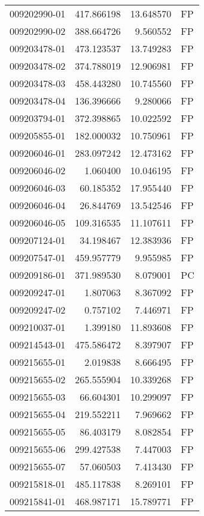 \begin{tabular}{lrrl}
009202990-01 &  417.866198 &    13.648570 &   FP \\
009202990-02 &  388.664726 &     9.560552 &   FP \\
009203478-01 &  473.123537 &    13.749283 &   FP \\
009203478-02 &  374.788019 &    12.906981 &   FP \\
009203478-03 &  458.443280 &    10.745560 &   FP \\
009203478-04 &  136.396666 &     9.280066 &   FP \\
009203794-01 &  372.398865 &    10.022592 &   FP \\
009205855-01 &  182.000032 &    10.750961 &   FP \\
009206046-01 &  283.097242 &    12.473162 &   FP \\
009206046-02 &    1.060400 &    10.046195 &   FP \\
009206046-03 &   60.185352 &    17.955440 &   FP \\
009206046-04 &   26.844769 &    13.542546 &   FP \\
009206046-05 &  109.316535 &    11.107611 &   FP \\
009207124-01 &   34.198467 &    12.383936 &   FP \\
009207547-01 &  459.957779 &     9.955985 &   FP \\
009209186-01 &  371.989530 &     8.079001 &   PC \\
009209247-01 &    1.807063 &     8.367092 &   FP \\
009209247-02 &    0.757102 &     7.446971 &   FP \\
009210037-01 &    1.399180 &    11.893608 &   FP \\
009214543-01 &  475.586472 &     8.397907 &   FP \\
009215655-01 &    2.019838 &     8.666495 &   FP \\
009215655-02 &  265.555904 &    10.339268 &   FP \\
009215655-03 &   66.604301 &    10.299097 &   FP \\
009215655-04 &  219.552211 &     7.969662 &   FP \\
009215655-05 &   86.403179 &     8.082854 &   FP \\
009215655-06 &  299.427538 &     7.447003 &   FP \\
009215655-07 &   57.060503 &     7.413430 &   FP \\
009215818-01 &  485.117838 &     8.269101 &   FP \\
009215841-01 &  468.987171 &    15.789771 &   FP \\

\end{tabular}
